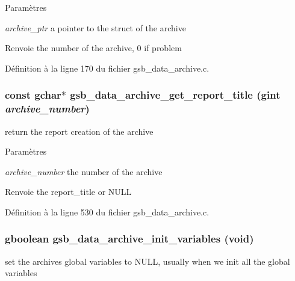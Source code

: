 \begin{DoxyParams}{Paramètres}
\item[{\em archive\_\-ptr}]a pointer to the struct of the archive\end{DoxyParams}
\begin{DoxyReturn}{Renvoie}
the number of the archive, 0 if problem 
\end{DoxyReturn}


Définition à la ligne 170 du fichier gsb\_\-data\_\-archive.c.

\subsubsection[{gsb\_\-data\_\-archive\_\-get\_\-report\_\-title}]{\setlength{\rightskip}{0pt plus 5cm}const gchar$\ast$ gsb\_\-data\_\-archive\_\-get\_\-report\_\-title (gint {\em archive\_\-number})}\label{gsb__data__archive_8c_a3d8b5fb39ae27430a4ef69a8de23c016}
return the report creation of the archive


\begin{DoxyParams}{Paramètres}
\item[{\em archive\_\-number}]the number of the archive\end{DoxyParams}
\begin{DoxyReturn}{Renvoie}
the report\_\-title or NULL 
\end{DoxyReturn}


Définition à la ligne 530 du fichier gsb\_\-data\_\-archive.c.

\subsubsection[{gsb\_\-data\_\-archive\_\-init\_\-variables}]{\setlength{\rightskip}{0pt plus 5cm}gboolean gsb\_\-data\_\-archive\_\-init\_\-variables (void)}\label{gsb__data__archive_8c_a1167784bcdd0ebef214194f217a6db7e}
set the archives global variables to NULL, usually when we init all the global variables


